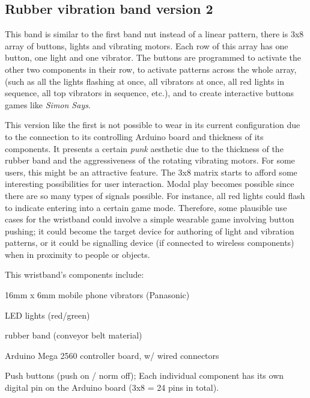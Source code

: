 \documentclass{chi-ext}
\begin{document}
\subsection{Rubber vibration band version 2}
This band is similar to the first band nut instead of a linear pattern, there is 3x8 array of buttons, lights and vibrating motors. Each row of this array has one button, one light and one vibrator. The buttons are programmed to activate the other two components in their row, to activate patterns across the whole array, (such as all the lights flashing at once, all vibrators at once, all red lights in sequence, all top vibrators in sequence, etc.), and to create interactive buttons games like \emph{Simon Says}.

This version like the first is not possible to wear in its current configuration due to the connection to its controlling Arduino board and thickness of its components. It presents a certain \emph{punk} aesthetic due to the thickness of the rubber band and the aggressiveness of the rotating vibrating motors. For some users, this might be an attractive feature. The 3x8 matrix starts to afford some interesting possibilities for user interaction. Modal play becomes possible since there are so many types of signals possible. For instance, all red lights could flash to indicate entering into a certain game mode. Therefore, some plausible use cases for the wristband could involve a simple wearable game involving button pushing; it could become the target device for authoring of light and vibration patterns, or it could be signalling device (if connected to wireless components) when in proximity to people or objects.

This wristband's components include:
\begin{inparaenum}
\item 16mm x 6mm mobile phone vibrators (Panasonic)
\item LED lights (red/green)
\item rubber band (conveyor belt material)
\item Arduino Mega 2560 controller board, w/ wired connectors
\item Push buttons (push on / norm off); Each individual component has its own digital pin on the Arduino board (3x8 = 24 pins in total).
\end{inparaenum}
\end{document}
